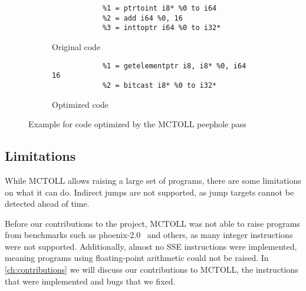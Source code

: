 \begin{figure}[htpb]
    \centering
    \begin{subfigure}[t]{.45\textwidth}
        \begin{lstlisting}
            %1 = ptrtoint i8* %0 to i64
            %2 = add i64 %0, 16
            %3 = inttoptr i64 %0 to i32*
        \end{lstlisting}
        \caption{Original code}
    \end{subfigure}
    \begin{subfigure}[t]{.45\textwidth}
        \begin{lstlisting}
            %1 = getelementptr i8, i8* %0, i64 16
            %2 = bitcast i8* %0 to i32*
        \end{lstlisting}
        \caption{Optimized code}
    \end{subfigure}
    \caption{Example for code optimized by the MCTOLL peephole pass}
    \label{fig:peephole-opt}
\end{figure}


\subsection{Limitations}\label{subsec:limitations}

While MCTOLL allows raising a large set of programs, there are some limitations on what it can do.
Indirect jumps are not supported, as jump targets cannot be detected ahead of time.

Before our contributions to the project, MCTOLL was not able to raise programs from benchmarks such as phoenix-2.0~\parencite{phoenix} and others, as many integer instructions were not supported.
Additionally, almost no SSE instructions were implemented, meaning programs using floating-point arithmetic could not be raised.
In \cref{ch:contributions} we will discuss our contributions to MCTOLL, the instructions that were implemented and bugs that we fixed.
